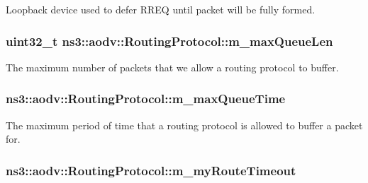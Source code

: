 Loopback device used to defer R\+R\+EQ until packet will be fully formed. 

\subsubsection[{\texorpdfstring{m\+\_\+max\+Queue\+Len}{m_maxQueueLen}}]{\setlength{\rightskip}{0pt plus 5cm}uint32\+\_\+t ns3\+::aodv\+::\+Routing\+Protocol\+::m\+\_\+max\+Queue\+Len\hspace{0.3cm}{\ttfamily [private]}}\hypertarget{classns3_1_1aodv_1_1RoutingProtocol_a5ded249d42f2e6364728892f32c15d9b}{}\label{classns3_1_1aodv_1_1RoutingProtocol_a5ded249d42f2e6364728892f32c15d9b}


The maximum number of packets that we allow a routing protocol to buffer. 

\subsubsection[{\texorpdfstring{m\+\_\+max\+Queue\+Time}{m_maxQueueTime}}]{ ns3\+::aodv\+::\+Routing\+Protocol\+::m\+\_\+max\+Queue\+Time\hspace{0.3cm}{\ttfamily [private]}}\hypertarget{classns3_1_1aodv_1_1RoutingProtocol_a33caddd54ebe2e9c177b8986b5abb7ba}{}\label{classns3_1_1aodv_1_1RoutingProtocol_a33caddd54ebe2e9c177b8986b5abb7ba}


The maximum period of time that a routing protocol is allowed to buffer a packet for. 

\subsubsection[{\texorpdfstring{m\+\_\+my\+Route\+Timeout}{m_myRouteTimeout}}]{ ns3\+::aodv\+::\+Routing\+Protocol\+::m\+\_\+my\+Route\+Timeout\hspace{0.3cm}{\ttfamily [private]}}\hypertarget{classns3_1_1aodv_1_1RoutingProtocol_a7681a59458486d0b7a61937a9a90b0a1}{}\label{classns3_1_1aodv_1_1RoutingProtocol_a7681a59458486d0b7a61937a9a90b0a1}


